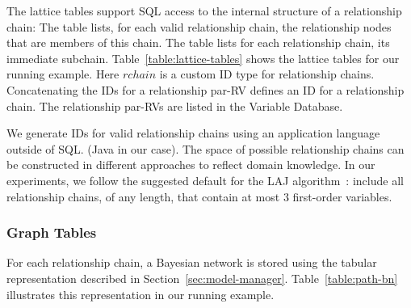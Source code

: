 The lattice tables support SQL access to the internal structure of a relationship chain: The  table lists, for each valid relationship chain, the relationship nodes that are members of this chain. The  table lists for each relationship chain, its immediate subchain. Table~\ref{table:lattice-tables} shows the lattice tables for our running example. Here $\mathit{rchain}$ is a custom ID type for relationship chains. Concatenating the IDs for a relationship par-RV defines an ID for a relationship chain. The relationship par-RVs are listed in the Variable Database. 

We generate IDs for valid relationship chains using an application language outside of SQL. (Java in our case). The space of possible relationship chains can be constructed in different approaches to reflect domain knowledge. In our experiments, we follow the suggested default for the LAJ algorithm~\cite{Schulte2012}: include all relationship chains, of any length, that contain at most 3 first-order variables.

\subsubsection{Graph Tables}

For each relationship chain, a Bayesian network is stored using the tabular representation described in Section~\ref{sec:model-manager}. Table~\ref{table:path-bn} illustrates this representation in our running example.


